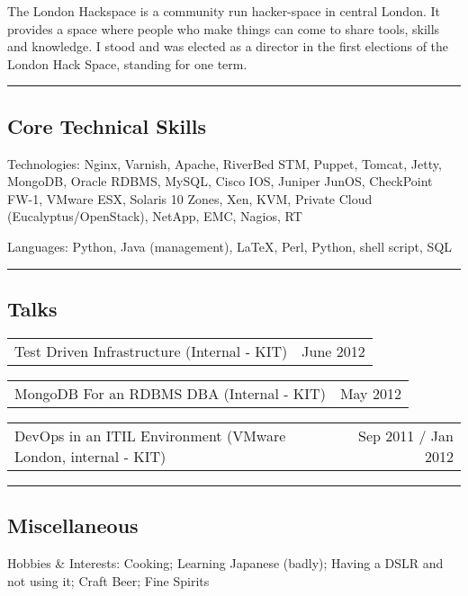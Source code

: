 \documentclass[10pt,a4paper]{article}
\makeatletter
\newenvironment{indentsection}[1]%
{\begin{list}{}%
	{\setlength{\leftmargin}{#1}}%
	\item[]%
}
{\end{list}}
\newcommand{\headerrow}[2]
{\begin{tabular*}{\linewidth}{l@{\extracolsep{\fill}}r}
	#1 &
	#2 \\
\end{tabular*}}
\makeatother
\begin{document}
\begin{itemize}
		The London Hackspace is a community run hacker-space in central London. It provides a space where people who make things can come to share tools, skills and knowledge. I stood and was elected as a director in the first elections of the London Hack Space, standing for one term.


\end{itemize}

\hrule
\vspace{-0.4em}
\subsection*{Core Technical Skills}

\begin{indentsection}{\parindent}
\begin{description*}
	\item[Technologies:]
	Nginx, Varnish, Apache, RiverBed STM, Puppet, Tomcat, Jetty, MongoDB, Oracle RDBMS, MySQL, Cisco IOS, Juniper JunOS, CheckPoint FW-1, VMware ESX, Solaris 10 Zones, Xen, KVM, Private Cloud (Eucalyptus/OpenStack), NetApp, EMC, Nagios, RT
	\item[Languages:]
	Python, Java (management), \LaTeX, Perl, Python, shell script, SQL
\end{description*}
\end{indentsection}




\hrule
\vspace{-0.4em}
\subsection*{Talks}
    \headerrow
		{Test Driven Infrastructure (Internal - KIT)}
		{June 2012}
    \headerrow
		{MongoDB For an RDBMS DBA (Internal - KIT)}
		{May 2012}
    \headerrow
		{DevOps in an ITIL Environment (VMware London, internal - KIT)}
		{Sep 2011 / Jan 2012}

\hrule
\vspace{-0.4em}
\subsection*{Miscellaneous}

\begin{indentsection}{\parindent}
\begin{description*}
	\item[Hobbies \& Interests:]
	Cooking; Learning Japanese (badly); Having a DSLR and not using it; Craft Beer; Fine Spirits
\end{description*}
\end{indentsection}
\end{document}

